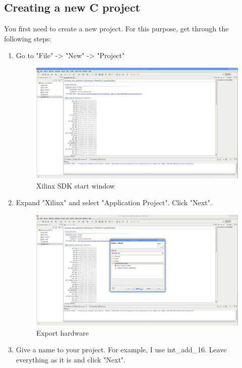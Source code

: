 \documentclass{article}
\begin{document}
		\subsection{Creating a new C project}
		You first need to create a new project.
		For this purpose, get through the following steps:\\
			\begin {enumerate}
			\item Go to "File" -> "New" -> "Project"
	\begin{figure}
	\includegraphics[scale=0.25]{pictures/XSDKMain.png}
	\caption{Xilinx SDK start window}
	\end{figure}
			\item Expand "Xilinx" and select "Application Project". Click
			"Next".
	\begin{figure}
	\includegraphics[scale=0.25]{pictures/XSDKNewProject1.png}
	\caption{Export hardware}
	\end{figure}
			\item Give a name to your project. For example, I use int\_add\_16.
			Leave everything as it is and click "Next".
	\begin{figure}

\end{figure}
\end{enumerate}
\end{document}
